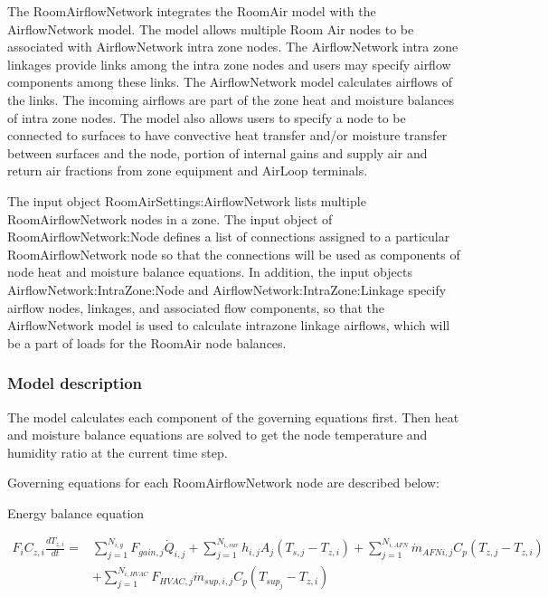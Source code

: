 The RoomAirflowNetwork integrates the RoomAir model with the AirflowNetwork model. The model allows multiple Room Air nodes to be associated with AirflowNetwork intra zone nodes. The AirflowNetwork intra zone linkages provide links among the intra zone nodes and users may specify airflow components among these links. The AirflowNetwork model calculates airflows of the links. The incoming airflows are part of the zone heat and moisture balances of intra zone nodes. The model also allows users to specify a node to be connected to surfaces to have convective heat transfer and/or moisture transfer between surfaces and the node, portion of internal gains and supply air and return air fractions from zone equipment and AirLoop terminals.

The input object RoomAirSettings:AirflowNetwork lists multiple RoomAirflowNetwork nodes in a zone. The input object of RoomAirflowNetwork:Node defines a list of connections assigned to a particular RoomAirflowNetwork node so that the connections will be used as components of node heat and moisture balance equations. In addition, the input objects AirflowNetwork:IntraZone:Node and AirflowNetwork:IntraZone:Linkage specify airflow nodes, linkages, and associated flow components, so that the AirflowNetwork model is used to calculate intrazone linkage airflows, which will be a part of loads for the RoomAir node balances.

\subsubsection{Model description}\label{model-description-3-001}

The model calculates each component of the governing equations first. Then heat and moisture balance equations are solved to get the node temperature and humidity ratio at the current time step.

Governing equations for each RoomAirflowNetwork node are described below:

Energy balance equation

\begin{equation}
\begin{split}
{F_i}{C_{z,i}}\frac{{d{T_{z,i}}}}{{dt}} =& \sum\limits_{j = 1}^{{N_{i,g}}} {{F_{gain,j}{\dot Q}_{i,j}}}  + \sum\limits_{j = 1}^{{N_{i,sur}}} {{h_{i,j}}} {A_j}\left( {{T_{s,j}} - {T_{z,i}}} \right) + \sum\limits_{j = 1}^{{N_{i,AFN}}} {{{\dot m}_{AFN i,j}}} {C_p}\left( {{T_{z,j}} - {T_{z,i}}} \right)\, \\
&+ \sum\limits_{j = 1}^{{N_{i,HVAC}}} {{{F_{HVAC,j}}{\dot m}_{sup,i,j}}} {C_p}\left( {{T_{sup_j}} - {T_{z,i}}} \right)
\end{split}
\end{equation}

